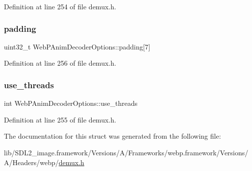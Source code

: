 Definition at line 254 of file demux.\+h.

\mbox{\label{struct_web_p_anim_decoder_options_aba7c45d13c4af36fd288db52fd7fa8f4}} 
\subsubsection{\texorpdfstring{padding}{padding}}
{\footnotesize\ttfamily uint32\+\_\+t Web\+P\+Anim\+Decoder\+Options\+::padding\mbox{[}7\mbox{]}}



Definition at line 256 of file demux.\+h.

\mbox{\label{struct_web_p_anim_decoder_options_ab4673c46c0607142f5e736c38ecd17fe}} 
\subsubsection{\texorpdfstring{use\_threads}{use\_threads}}
{\footnotesize\ttfamily int Web\+P\+Anim\+Decoder\+Options\+::use\+\_\+threads}



Definition at line 255 of file demux.\+h.



The documentation for this struct was generated from the following file\+:\begin{DoxyCompactItemize}
\item 
lib/\+S\+D\+L2\+\_\+image.\+framework/\+Versions/\+A/\+Frameworks/webp.\+framework/\+Versions/\+A/\+Headers/webp/\mbox{\hyperlink{demux_8h}{demux.\+h}}\end{DoxyCompactItemize}
